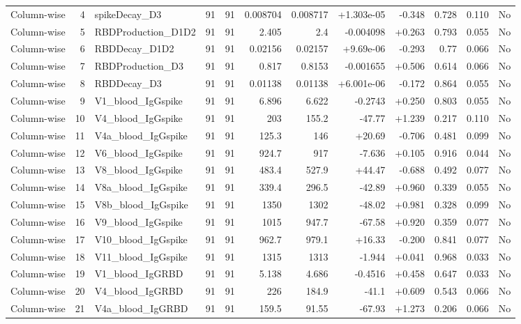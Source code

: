 \begin{landscape}
\begin{longtable}{@{}lrp{4.0cm}rrrrrrrrr@{}}
Column-wise & 4 & spikeDecay\_D3 & 91 & 91 & 0.008704 & 0.008717 & +1.303e-05 & -0.348 & 0.728 & 0.110 & No \\
Column-wise & 5 & RBDProduction\_D1D2 & 91 & 91 & 2.405 & 2.4 & -0.004098 & +0.263 & 0.793 & 0.055 & No \\
Column-wise & 6 & RBDDecay\_D1D2 & 91 & 91 & 0.02156 & 0.02157 & +9.69e-06 & -0.293 & 0.77 & 0.066 & No \\
Column-wise & 7 & RBDProduction\_D3 & 91 & 91 & 0.817 & 0.8153 & -0.001655 & +0.506 & 0.614 & 0.066 & No \\
Column-wise & 8 & RBDDecay\_D3 & 91 & 91 & 0.01138 & 0.01138 & +6.001e-06 & -0.172 & 0.864 & 0.055 & No \\
Column-wise & 9 & V1\_blood\_IgGspike & 91 & 91 & 6.896 & 6.622 & -0.2743 & +0.250 & 0.803 & 0.055 & No \\
Column-wise & 10 & V4\_blood\_IgGspike & 91 & 91 & 203 & 155.2 & -47.77 & +1.239 & 0.217 & 0.110 & No \\
Column-wise & 11 & V4a\_blood\_IgGspike & 91 & 91 & 125.3 & 146 & +20.69 & -0.706 & 0.481 & 0.099 & No \\
Column-wise & 12 & V6\_blood\_IgGspike & 91 & 91 & 924.7 & 917 & -7.636 & +0.105 & 0.916 & 0.044 & No \\
Column-wise & 13 & V8\_blood\_IgGspike & 91 & 91 & 483.4 & 527.9 & +44.47 & -0.688 & 0.492 & 0.077 & No \\
Column-wise & 14 & V8a\_blood\_IgGspike & 91 & 91 & 339.4 & 296.5 & -42.89 & +0.960 & 0.339 & 0.055 & No \\
Column-wise & 15 & V8b\_blood\_IgGspike & 91 & 91 & 1350 & 1302 & -48.02 & +0.981 & 0.328 & 0.099 & No \\
Column-wise & 16 & V9\_blood\_IgGspike & 91 & 91 & 1015 & 947.7 & -67.58 & +0.920 & 0.359 & 0.077 & No \\
Column-wise & 17 & V10\_blood\_IgGspike & 91 & 91 & 962.7 & 979.1 & +16.33 & -0.200 & 0.841 & 0.077 & No \\
Column-wise & 18 & V11\_blood\_IgGspike & 91 & 91 & 1315 & 1313 & -1.944 & +0.041 & 0.968 & 0.033 & No \\
Column-wise & 19 & V1\_blood\_IgGRBD & 91 & 91 & 5.138 & 4.686 & -0.4516 & +0.458 & 0.647 & 0.033 & No \\
Column-wise & 20 & V4\_blood\_IgGRBD & 91 & 91 & 226 & 184.9 & -41.1 & +0.609 & 0.543 & 0.066 & No \\
Column-wise & 21 & V4a\_blood\_IgGRBD & 91 & 91 & 159.5 & 91.55 & -67.93 & +1.273 & 0.206 & 0.066 & No \\

\end{longtable}
\end{landscape}
